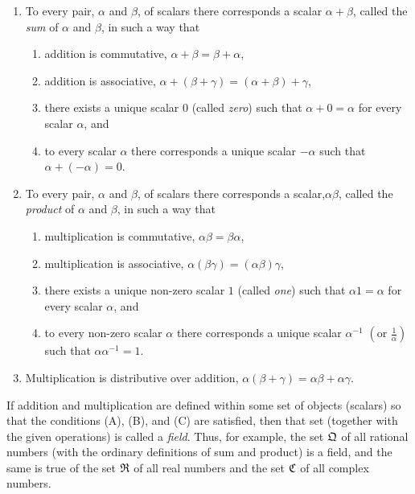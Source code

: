 \begin{enumerate}[label=(\Alph*),wide]
    \item To every pair, \(\alpha\) and \(\beta\), of scalars there corresponds
        a scalar \(\alpha + \beta\), called the \emph{sum} of \(\alpha\) and
        \(\beta\), in such a way that
    \begin{enumerate}[label=(\arabic*), wide]
        \item addition is commutative, \(\alpha + \beta = \beta + \alpha\),
        \item addition is associative, \(\alpha + (\beta + \gamma) =
            (\alpha + \beta) + \gamma\),
        \item there exists a unique scalar \(0\) (called \emph{zero}) such that
            \(\alpha + 0 = \alpha\) for every scalar \(\alpha\), and
        \item to every scalar \(\alpha\) there corresponds a unique scalar \(-\alpha\)
            such that \(\alpha + (-\alpha) = 0\).
    \end{enumerate}
    \smallskip
    \item To every pair, \(\alpha\) and \(\beta\), of scalars there corresponds
        a scalar,\(\alpha \beta\), called the \emph{product} of \(\alpha\) and
        \(\beta\), in such a way that
    \begin{enumerate}[label=(\arabic*), wide]
        \item multiplication is commutative, \(\alpha \beta = \beta \alpha\),
        \item multiplication is associative, \(\alpha (\beta \gamma) =
            (\alpha \beta) \gamma\),
        \item there exists a unique non-zero scalar \(1\) (called \emph{one}) such that
            \(\alpha 1 = \alpha\) for every scalar \(\alpha\), and
        \item to every non-zero scalar \(\alpha\) there corresponds a unique scalar
            \(\alpha^{-1}\) \(\displaystyle\left(\text{or }\frac{1}{\alpha}\right)\) such that \(\alpha \alpha^{-1} = 1\).
    \end{enumerate}
    \smallskip
    \item Multiplication is distributive over addition, \(\alpha (\beta + \gamma) =
        \alpha \beta + \alpha \gamma\).
\end{enumerate}

If addition and multiplication are defined within some set of objects (scalars)
so that the conditions (A), (B), and (C) are satisfied, then that set (together
with the given operations) is called a \emph{field}. Thus, for example, the set
\(\mathfrak{Q}\) of all rational numbers (with the ordinary definitions of sum and
product) is a field, and the same is true of the set \(\mathfrak{R}\) of all real numbers and
the set \(\mathfrak{C}\) of all complex numbers.

